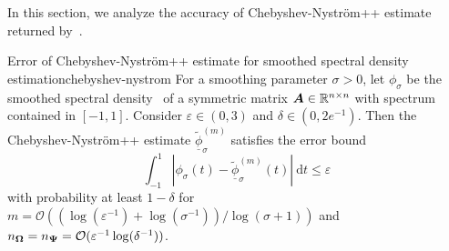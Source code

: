 In this section, we analyze the accuracy of Chebyshev-Nyström++ estimate returned by~. 
\begin{theorem}{Error of Chebyshev-Nyström++ estimate for smoothed spectral density estimation}{chebyshev-nystrom}
    For a smoothing parameter $\sigma > 0$, let $\phi_{\sigma}$ be the smoothed spectral density~ of a symmetric matrix $\boldsymbol{A} \in \mathbb{R}^{n \times n}$ with spectrum contained in $[-1, 1]$. Consider $\varepsilon \in (0, 3)$ and $\delta \in (0, 2 e^{-1})$.
    Then the Chebyshev-Nyström++ estimate $\widetilde{\underline{\phi}}_{\sigma}^{(m)}$ 
    satisfies the error bound
    \begin{equation}
        \int_{-1}^{1} \left| \phi_{\sigma}(t) - \widetilde{\underline{\phi}}_{\sigma}^{(m)}(t) \right|~\mathrm{d}t \leq \varepsilon
        \label{equ:chebyshev-nystrom-error}
    \end{equation}
    with probability at least $1 - \delta$ for $m = \mathcal{O}((\log(\varepsilon^{-1}) + \log(\sigma^{-1})) / \log(\sigma + 1))$  and $n_{\boldsymbol{\Omega}} = n_{\boldsymbol{\Psi}} = \mathcal{O}(\varepsilon^{-1}\log(\delta^{-1}))$.
\end{theorem}


